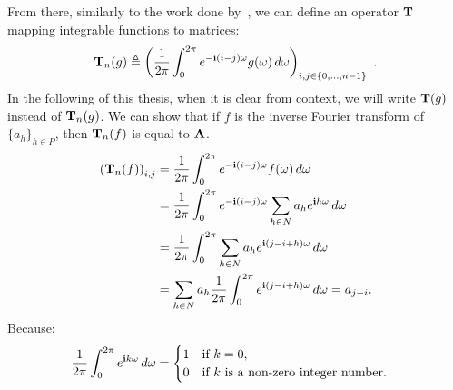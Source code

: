 From there, similarly to the work done by~\citet{gray2006toeplitz}, we can define an operator $\mathbf{T}$ mapping integrable functions to matrices:
\begin{equation}
  \Tmat_n(g) \triangleq \leftmat\frac{1}{2\pi}\int_{0}^{2\pi}e^{-\ci(i-j)\omega}g(\omega)\,d\omega\rightmat_{i,j\in\{0,\ldots,n-1\}} \enspace.
  \label{equation:ch2-toeplitz_operator}
\end{equation}
\noindent
In the following of this thesis, when it is clear from context, we will write $\mathbf{T}(g)$ instead of $\mathbf{T}_n(g)$.
We can show that if $f$ is the inverse Fourier transform of $\{a_h\}_{h \in P}$, then $\mathbf{T}_n(f)$ is equal to $\mathbf{A}$.
\begingroup
\allowdisplaybreaks
  \begin{align}
      \leftmat \Tmat_n(f) \rightmat_{i, j} &= \frac{1}{2\pi} \int_0^{2\pi} e^{-\ci (i-j)\omega} f(\omega) \,d\omega  \\
      &= \frac{1}{2\pi} \int_0^{2\pi} e^{-\ci (i-j) \omega} \sum_{h \in N} a_h e^{\ci h \omega} \,d\omega  \\
      &= \frac{1}{2\pi} \int_0^{2\pi} \sum_{h \in N} a_h e^{\ci (j - i + h) \omega} \,d\omega  \\
      &= \sum_{h \in N} a_h \frac{1}{2\pi} \int_0^{2\pi} e^{\ci (j - i + h) \omega} \,d\omega 
      = a_{j-i} .
  \end{align}
\endgroup
Because:
\begin{equation}
  \frac{1}{2\pi} \int_0^{2\pi} e^{\mathbf{i} k \omega} \,d\omega = 
  \begin{cases}
    1 \quad \text{if}\ k = 0, \\
    0 \quad \text{if}\ k\ \text{is a non-zero integer number.}
  \end{cases}
\end{equation}




